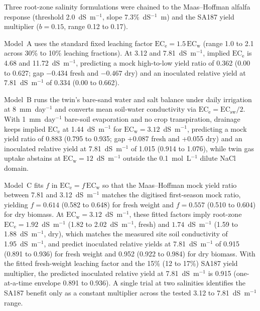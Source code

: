 \documentclass[11pt,a4paper]{article}
\begin{document}
Three root-zone salinity formulations were chained to the Maas--Hoffman alfalfa response (threshold 2.0~dS~m$^{-1}$, slope 7.3\%~dS$^{-1}$~m) and the SA187 yield multiplier ($b=0.15$, range 0.12 to 0.17).

Model~A uses the standard fixed leaching factor $\mathrm{EC_e}=1.5\,\mathrm{EC_w}$ (range 1.0 to 2.1 across 30\% to 10\% leaching fractions). At 3.12 and 7.81~dS~m$^{-1}$, implied $\mathrm{EC_e}$ is 4.68 and 11.72~dS~m$^{-1}$, predicting a mock high-to-low yield ratio of 0.362 (0.00 to 0.627; gap $-0.434$ fresh and $-0.467$ dry) and an inoculated relative yield at 7.81~dS~m$^{-1}$ of 0.334 (0.00 to 0.662).

Model~B runs the twin's bare-sand water and salt balance under daily irrigation at 8~mm~day$^{-1}$ and converts mean soil-water conductivity via $\mathrm{EC_e}=\mathrm{EC_{sw}}/2$. With 1~mm~day$^{-1}$ bare-soil evaporation and no crop transpiration, drainage keeps implied $\mathrm{EC_e}$ at 1.44~dS~m$^{-1}$ for $\mathrm{EC_w}=3.12$~dS~m$^{-1}$, predicting a mock yield ratio of 0.883 (0.795 to 0.935; gap +0.087 fresh and +0.055 dry) and an inoculated relative yield at 7.81~dS~m$^{-1}$ of 1.015 (0.914 to 1.076), while twin gas uptake abstains at $\mathrm{EC_w}=12$~dS~m$^{-1}$ outside the 0.1~mol~L$^{-1}$ dilute NaCl domain.

Model~C fits $f$ in $\mathrm{EC_e}=f\,\mathrm{EC_w}$ so that the Maas--Hoffman mock yield ratio between 7.81 and 3.12~dS~m$^{-1}$ matches the digitised first-season mock ratio, yielding $f=0.614$ (0.582 to 0.648) for fresh weight and $f=0.557$ (0.510 to 0.604) for dry biomass. At $\mathrm{EC_w}=3.12$~dS~m$^{-1}$, these fitted factors imply root-zone $\mathrm{EC_e}=1.92$~dS~m$^{-1}$ (1.82 to 2.02~dS~m$^{-1}$, fresh) and $1.74$~dS~m$^{-1}$ (1.59 to 1.88~dS~m$^{-1}$, dry), which matches the measured site soil conductivity of 1.95~dS~m$^{-1}$, and predict inoculated relative yields at 7.81~dS~m$^{-1}$ of 0.915 (0.891 to 0.936) for fresh weight and 0.952 (0.922 to 0.984) for dry biomass. With the fitted fresh-weight leaching factor and the 15\% (12 to 17\%) SA187 yield multiplier, the predicted inoculated relative yield at 7.81~dS~m$^{-1}$ is 0.915 (one-at-a-time envelope 0.891 to 0.936). A single trial at two salinities identifies the SA187 benefit only as a constant multiplier across the tested 3.12 to 7.81~dS~m$^{-1}$ range.
\end{document}
